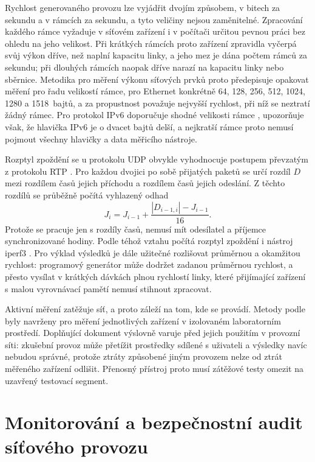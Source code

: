 Rychlost generovaného provozu lze vyjádřit dvojím způsobem, v bitech za sekundu a v rámcích za sekundu, a tyto veličiny nejsou zaměnitelné. Zpracování každého rámce vyžaduje v síťovém zařízení i v počítači určitou pevnou práci bez ohledu na jeho velikost. Při krátkých rámcích proto zařízení zpravidla vyčerpá svůj výkon dříve, než naplní kapacitu linky, a jeho mez je dána počtem rámců za sekundu; při dlouhých rámcích naopak dříve narazí na kapacitu linky nebo sběrnice. Metodika pro měření výkonu síťových prvků \cite{rfc2544} proto předepisuje opakovat měření pro řadu velikostí rámce, pro Ethernet konkrétně 64, 128, 256, 512, 1024, 1280 a 1518~bajtů, a za propustnost považuje nejvyšší rychlost, při níž se neztratí žádný rámec. Pro protokol IPv6 doporučuje shodné velikosti rámce \cite{rfc5180}, upozorňuje však, že hlavička IPv6 je o dvacet bajtů delší, a nejkratší rámce proto nemusí pojmout všechny hlavičky a data měřicího nástroje.

Rozptyl zpoždění se u protokolu UDP obvykle vyhodnocuje postupem převzatým z protokolu RTP \cite{rfc3550}. Pro každou dvojici po sobě přijatých paketů se určí rozdíl $D$ mezi rozdílem časů jejich příchodu a rozdílem časů jejich odeslání. Z těchto rozdílů se průběžně počítá vyhlazený odhad
\begin{equation}
    J_i = J_{i-1} + \frac{|D_{i-1,i}| - J_{i-1}}{16}.
    \label{eq:jitter}
\end{equation}
Protože se pracuje jen s rozdíly časů, nemusí mít odesílatel a příjemce synchronizované hodiny. Podle téhož vztahu počítá rozptyl zpoždění i nástroj iperf3 \cite{iperf3}. Pro výklad výsledků je dále užitečné rozlišovat průměrnou a okamžitou rychlost: programový generátor může dodržet zadanou průměrnou rychlost, a přesto vysílat v krátkých dávkách plnou rychlostí linky, které přijímající zařízení s malou vyrovnávací pamětí nemusí stihnout zpracovat.

Aktivní měření zatěžuje síť, a proto záleží na tom, kde se provádí. Metody podle \cite{rfc2544} byly navrženy pro měření jednotlivých zařízení v izolovaném laboratorním prostředí. Doplňující dokument \cite{rfc6815} výslovně varuje před jejich použitím v provozní síti: zkušební provoz může přetížit prostředky sdílené s uživateli a výsledky navíc nebudou správné, protože ztráty způsobené jiným provozem nelze od ztrát měřeného zařízení odlišit. Přenosný přístroj proto musí zátěžové testy omezit na uzavřený testovací segment.

\section{Monitorování a bezpečnostní audit síťového provozu}
\label{sec:monitorovani}

